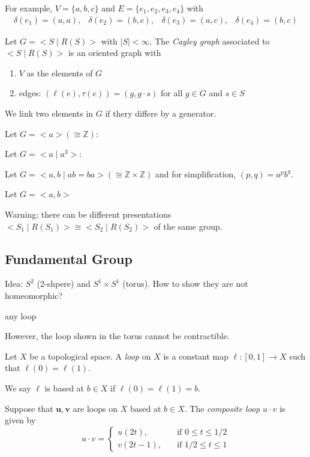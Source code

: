 For example, $V=\{a,b,c\}$ and $E=\{e_1,e_2,e_3,e_4\}$ with
\[
\begin{array}{llll}
\delta(e_1)=(a,a),
&
\delta(e_2)=(b,c),
&
\delta(e_3)=(a,c),
&
\delta(e_4)=(b,c)
\end{array}
\]

\begin{definition}
Let $G=<S\mid R(S)>$ with $|S|<\infty$.
The \emph{Cayley graph} associated to $<S\mid R(S)>$ is an oriented graph with
\begin{enumerate}
\item
$V$ as the elements of $G$
\item
edges: $(\ell(e),\tau(e))=(g,g\cdot s)$ for all $g\in G$ and $s\in S$
\end{enumerate}
We link two elements in $G$ if thery differe by a generator.
\end{definition}
\begin{example}
Let $G=<a> (\cong\mathbb{Z})$:

Let $G=<a\mid a^3>$:

Let $G=<a,b\mid ab=ba> (\cong\mathbb{Z}\times\mathbb{Z})$ and for simplification, $(p,q)=a^pb^q$.

Let $G=<a,b>$
\end{example}
Warning:
there can be different presentations $<S_1\mid R(S_1)>\cong<S_2\mid R(S_2)>$ of the same group.

\subsection{Fundamental Group}
Idea: $S^2$ (2-shpere) and $S^1\times S^1$ (torus).
How to show they are not homeomorphic?

any loop

However, the loop shown in the torus cannot be contractible.

\begin{definition}[loop]
Let $X$ be a topological space.
A \emph{loop} on $X$ is a constant map $\ell:[0,1]\to X$ such that $\ell(0) = \ell(1)$.

We say $\ell$ is based at $b\in X$ if $\ell(0)=\ell(1)=b$.
\end{definition}

\begin{definition}
Suppose that $\bm u,\bm v$ are loops on $X$ based at $b\in X$.
The \emph{composite loop} $u\cdot v$ is given by
\[
u\cdot v=\left\{
\begin{aligned}
u(2t),&\quad\text{if $0\le t\le1/2$}\\
v(2t-1),&\quad\text{if $1/2\le t\le1$}
\end{aligned}
\right.
\]
\end{definition}


